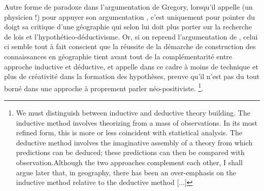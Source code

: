 Autre forme de paradoxe dans l'argumentation de Gregory, lorsqu'il appelle \textcite{Wilson1972} (un physicien !) pour appuyer son argumentation \autocite{Gregory1978}, c'est uniquement pour pointer du doigt sa critique d'une géographie qui selon lui doit plus porter sur la recherche de lois et l'hypothético-déductivisme. Or, si on reprend l'argumentation de \textcite{Wilson1972}, celui ci semble tout à fait conscient que la réussite de la démarche de construction des connaissances en géographie tient avant tout de la complémentarité entre approche inductive et déductive, et appelle dans ce cadre à moins de technique et plus de créativité dans la formation des hypothèses, preuve qu'il n'est pas du tout borné dans une approche à proprement parler néo-positiviste. \footnote{ We must distinguish between inductive and deductive theory building. The inductive method involves theorizing from a mass of observations. In its most refined form, this is more or less coincident with statistical analysis. The deductive method involves the imaginative assembly of a theory from which predictions can be deduced; these predictions can then be compared with observation.Although the two approaches complement each other, I shall argue later that, in geography, there has been an over-emphasis on the inductive method relative to the deductive method [...] }.

